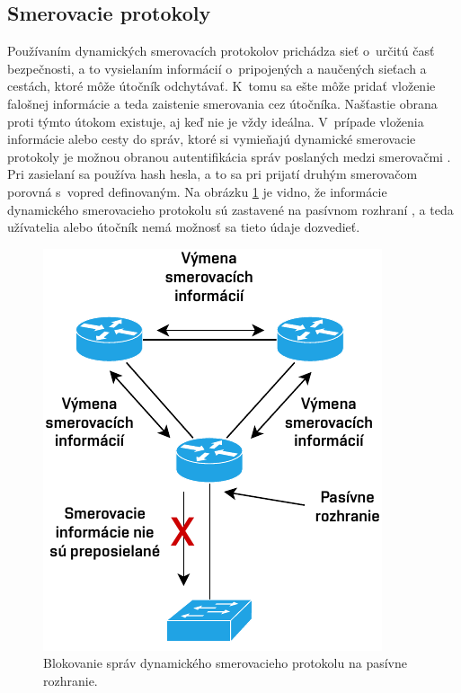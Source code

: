 \subsection{Smerovacie protokoly}
Používaním dynamických smerovacích protokolov prichádza sieť o~určitú časť bezpečnosti, a to vysielaním informácií o~pripojených a naučených sieťach a cestách, ktoré môže útočník odchytávať. K~tomu sa ešte môže pridať vloženie falošnej informácie a teda zaistenie smerovania cez útočníka. Našťastie obrana proti týmto útokom existuje, aj keď nie je vždy ideálna. V~prípade vloženia informácie alebo cesty do správ, ktoré si vymieňajú dynamické smerovacie protokoly je možnou obranou autentifikácia správ poslaných medzi smerovačmi \cite{McMillan2018}\cite{Singh2018}\cite{CIS_DrTLsgXv24lxeIIM}. Pri zasielaní sa používa hash hesla, a to sa pri prijatí druhým smerovačom porovná s~vopred definovaným. Na obrázku \ref{fig:passive-int} je vidno, že informácie dynamického smerovacieho protokolu sú zastavené na pasívnom rozhraní \cite{Khandelwal2016}, a teda užívatelia alebo útočník nemá možnosť sa tieto údaje dozvedieť.

\begin{figure}[H]
	\begin{center}
		\includegraphics[scale=1]{obrazky/passive-interface.pdf}
	\end{center}
	\caption[Pasívne rozhranie pri smerovacích protokoloch]{Blokovanie správ dynamického smerovacieho protokolu na pasívne rozhranie.}
	\label{fig:passive-int}
\end{figure} 


